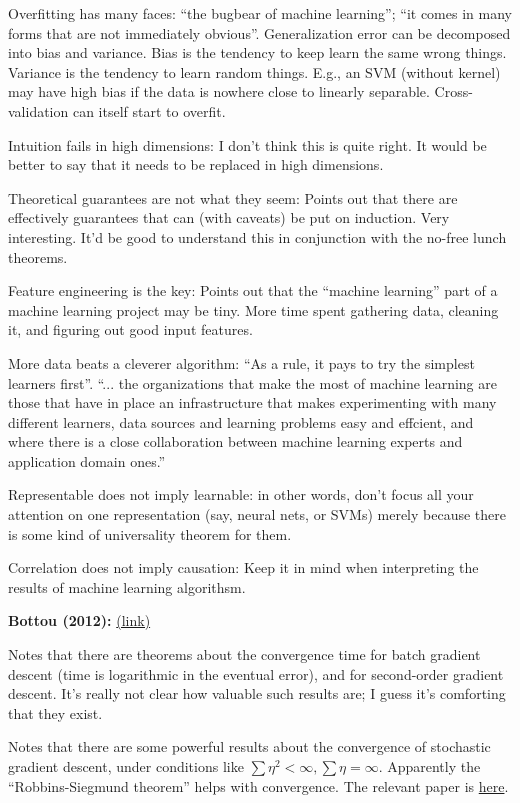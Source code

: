 \documentclass[12pt]{article}
\newcommand{\link}[2]{\href{#1}{#2}}
\begin{document}
Overfitting has many faces: ``the bugbear of machine learning''; ``it
comes in many forms that are not immediately obvious''.
Generalization error can be decomposed into bias and variance.  Bias
is the tendency to keep learn the same wrong things.  Variance is the
tendency to learn random things.  E.g., an SVM (without kernel) may
have high bias if the data is nowhere close to linearly separable.
Cross-validation can itself start to overfit.

Intuition fails in high dimensions: I don't think this is quite right.
It would be better to say that it needs to be replaced in high
dimensions.

Theoretical guarantees are not what they seem: Points out that there
are effectively guarantees that can (with caveats) be put on
induction.  Very interesting.  It'd be good to understand this in
conjunction with the no-free lunch theorems.

Feature engineering is the key: Points out that the ``machine
learning'' part of a machine learning project may be tiny.  More time
spent gathering data, cleaning it, and figuring out good input
features.

More data beats a cleverer algorithm: ``As a rule, it pays to try the
simplest learners first''.  ``... the organizations that make the most
of machine learning are those that have in place an infrastructure
that makes experimenting with many different learners, data sources
and learning problems easy and effcient, and where there is a close
collaboration between machine learning experts and application domain
ones.''

Representable does not imply learnable: in other words, don't focus
all your attention on one representation (say, neural nets, or SVMs)
merely because there is some kind of universality theorem for them.

Correlation does not imply causation: Keep it in mind when
interpreting the results of machine learning algorithsm.

\textbf{Bottou (2012):}
\link{http://leon.bottou.org/papers/bottou-tricks-2012}{(link)}

Notes that there are theorems about the convergence time for batch
gradient descent (time is logarithmic in the eventual error), and for
second-order gradient descent.  It's really not clear how valuable
such results are; I guess it's comforting that they exist.

Notes that there are some powerful results about the convergence of
stochastic gradient descent, under conditions like $\sum \eta^2 <
\infty, \sum \eta = \infty$.  Apparently the ``Robbins-Siegmund
theorem'' helps with convergence.  The relevant paper is
\link{http://scholar.google.ca/scholar?cluster=509989913518206088\&hl=en\&as\_sdt=0,5}{here}.
\end{document}
